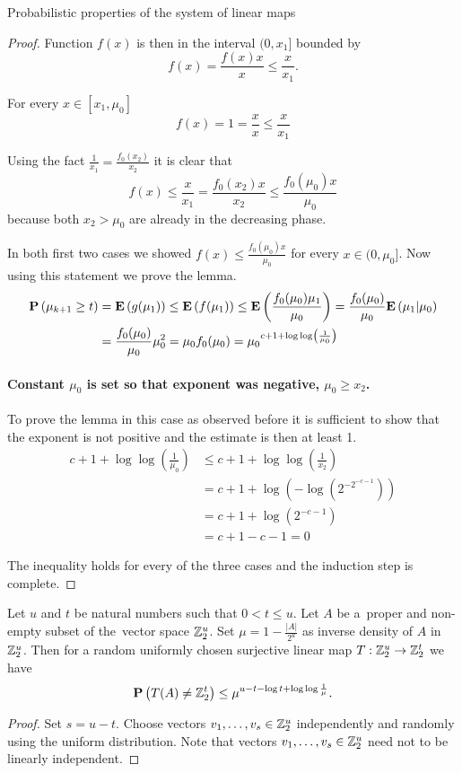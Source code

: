 \begin{section}{Probabilistic properties of the system of linear maps}
\begin{proof}
Function $f(x)$ is then in the interval $(0, x_1]$ bounded by \[f(x) = \frac{f(x)x}{x} \leq \frac{x}{x_1} \text{.} \]

For every $x \in [x_1, \mu_0]$ 
\[ 
	f(x) = 1 = \frac{x}{x} \leq \frac{x}{x_1}
\]

Using the fact $\frac{1}{x_1} = \frac{f_0(x_2)}{x_2}$ it is clear that 
\[
	f(x) \leq \frac{x}{x_1} = \frac{f_0(x_2)x}{x_2} \leq \frac{f_0(\mu_0)x}{\mu_0}
\]
because both $x_2 > \mu_0$ are already in the decreasing phase.

In both first two cases we showed $f(x) \leq \frac{f_0(\mu_0)x}{\mu_0}$ for every $x \in (0, \mu_0]$. Now using this statement we prove the lemma.
\[
\begin{split}
\mathbf{P}\left(\mu_{k + 1} \geq t\right)
	& = \mathbf{E}\left(g(\mu_1)\right) \leq \mathbf{E}\left(f(\mu_1)\right) \leq \mathbf{E}\left(\frac{f_0(\mu_0)\mu_1}{\mu_0}\right) = \frac{f_0(\mu_0)}{\mu_0}\mathbf{E}\left(\mu_1|\mu_0\right) \\
	& = \frac{f_0(\mu_0)}{\mu_0}\mu_0 ^ 2 = \mu_0 f_0(\mu_0) = {\mu_0}^{c + 1 + \log \log \left(\frac{1}{\mu_0}\right)}
\end{split}
\]

\paragraph{Constant $\mu_0$ is set so that exponent was negative, $\mu_0 \geq x_2$.}
To prove the lemma in this case as observed before it is sufficient to show that the exponent is not positive and the estimate is then at least 1.
\[
\begin{split}
	c + 1 + \log \log \left( \frac{1}{\mu_0} \right) 
		& \leq c + 1 + \log \log \left( \frac{1}{x_2} \right) \\ 
		& = c + 1 + \log \left(- \log \left(2 ^ {-2 ^ {-c - 1}}\right)\right) \\ 
		& = c + 1 + \log \left(2 ^ {-c - 1}\right) \\ 
		& = c + 1 - c - 1 = 0
\end{split}
\]

The inequality holds for every of the three cases and the induction step is complete.
\end{proof}

\begin{theorem}
\label{theorem-linear-function-set-onto}
Let $u$ and $t$ be natural numbers such that $0 < t \leq u$. Let $A$ be a~proper and non-empty subset of the~vector space $\mathbb{Z}_{2}^{u}$. Set $\mu = 1 - \frac{|A|}{2^u}$ as inverse density of $A$ in $\mathbb{Z}_{2}^{u}$. Then for a random uniformly chosen surjective linear map $T: \mathbb{Z}_{2}^{u} \rightarrow \mathbb{Z}_{2}^{t}$ we have
\[
	\mathbf{P}\left(T(A) \neq \mathbb{Z}_{2}^{t}\right) \leq \mu^{u - t - \log t + \log \log \frac{1}{\mu}} \textit{.}
\]
\end{theorem}
\begin{proof}
Set $s = u - t$. Choose vectors $v_1, \dots, v_s \in \mathbb{Z}_{2}^{u}$ independently and randomly using the uniform distribution. Note that vectors $v_1, \dots, v_s \in \mathbb{Z}_{2}^{u}$ need not to be linearly independent.


\end{proof}
\end{section}
